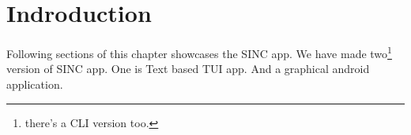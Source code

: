 \documentclass[../../main]{subfiles}
\begin{document}
\section{Indroduction} \label{sec:}

Following sections of this chapter showcases the SINC app. We have made two\footnote{there's a CLI
version too.} version of SINC app. One is Text based TUI app. And a graphical android application.
\end{document}
